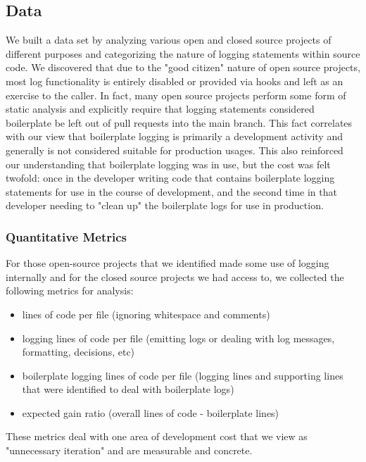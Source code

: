\documentclass[acmsmall,review,authorversion]{acmart}
\begin{document}
\subsection{Data}

We built a data set by analyzing various open and closed source projects of different purposes and categorizing the nature of logging statements within source code. We discovered that due to the "good citizen" nature of open source projects, most log functionality is entirely disabled or provided via hooks and left as an exercise to the caller. In fact, many open source projects perform some form of static analysis and explicitly require that logging statements considered boilerplate be left out of pull requests into the main branch. This fact correlates with our view that boilerplate logging is primarily a development activity and generally is not considered suitable for production usages. This also reinforced our understanding that boilerplate logging was in use, but the cost was felt twofold: once in the developer writing code that contains boilerplate logging statements for use in the course of development, and the second time in that developer needing to "clean up" the boilerplate logs for use in production.

\subsubsection{Quantitative Metrics}

For those open-source projects that we identified made some use of logging internally and for the closed source projects we had access to, we collected the following metrics for analysis:

\begin{itemize}
    \item lines of code per file (ignoring whitespace and comments)
    \item logging lines of code per file (emitting logs or dealing with log messages, formatting, decisions, etc)
    \item boilerplate logging lines of code per file (logging lines and supporting lines that were identified to deal with boilerplate logs)
    \item expected gain ratio (overall lines of code - boilerplate lines)
\end{itemize}

These metrics deal with one area of development cost that we view as "unnecessary iteration" and are measurable and concrete.
\end{document}
